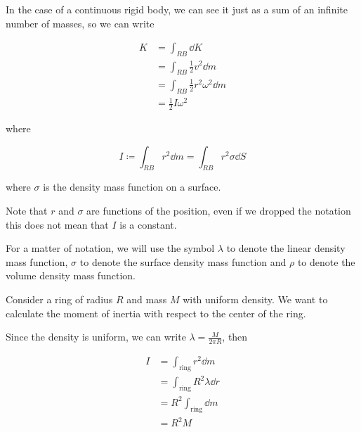 \documentclass[12pt]{extarticle}
\begin{document}
In the case of a continuous rigid body, we can see it just as a sum of an infinite number of masses, so we can write

\begin{align}
    K & = \int_{RB} \dd{K}                          \\
      & = \int_{RB} \frac{1}{2} v^2 \dd{m}          \\
      & = \int_{RB} \frac{1}{2} r^2 \omega^2 \dd{m} \\
      & = \frac{1}{2} I \omega^2
\end{align}

where

\begin{equation}
    I \coloneq \int_{RB} r^2 \dd{m} = \int_{RB} r^2 \sigma \dd{S}
\end{equation}

where $\sigma$ is the density mass function on a surface.

Note that $r$ and $\sigma$ are functions of the position, even if we dropped the notation this does not mean that $I$ is a constant.

\begin{remark}
    For a matter of notation, we will use the symbol $\lambda$ to denote the linear density mass function, $\sigma$ to denote the surface density mass function and $\rho$ to denote the volume density mass function.
\end{remark}

\begin{example}
    Consider a ring of radius $R$ and mass $M$ with uniform density. We want to calculate the moment of inertia with respect to the center of the ring.

    Since the density is uniform, we can write $\lambda = \frac{M}{2\pi R}$, then

    \begin{align}
        I & = \int_{\text{ring}} r^2 \dd{m}         \\
          & = \int_{\text{ring}} R^2 \lambda \dd{r} \\
          & =  R^2 \int_{\text{ring}} \dd{m}        \\
          & = R^2 M
    \end{align}
\end{example}
\end{document}
